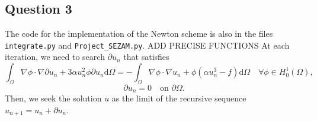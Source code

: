 \documentclass[11pt, a4paper, twoside]{article}
\newcommand{\grad}{\nabla} %
\newcommand{\Hunz}{H^1_0(\Omega)}
\newcommand{\intom}{\int_\Omega}
\renewcommand{\d}{\text{d}}
\begin{document}

\subsection*{Question 3}
The code for the implementation of the Newton scheme is also in the files \verb+integrate.py+ and \verb+Project_SEZAM.py+. ADD PRECISE FUNCTIONS
At each iteration, we need to search $\partial u_n$ that satisfies 
$$\intom \grad \phi \cdot \grad \partial u_n + 3\alpha u_n^2 \phi \partial u_n \d\Omega = - \intom \grad \phi \cdot \grad u_n + \phi (\alpha u_n^3 - f) \d\Omega \quad \forall \phi\in \Hunz, $$
$$\partial u_n = 0 \quad \text{on } \partial\Omega.$$
Then, we seek the solution $u$ as the limit of the recursive sequence $u_{n+1} =u_n + \partial u_n$.
\end{document}
